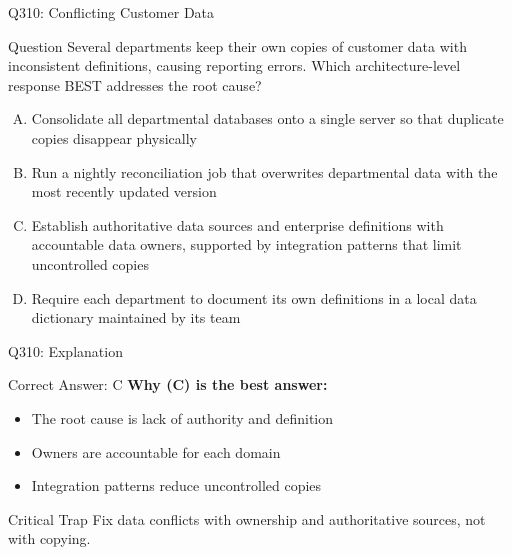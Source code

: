 \documentclass{beamer}
\begin{document}
	\begin{frame}{Q310: Conflicting Customer Data}
		\begin{block}{Question}
			\small Several departments keep their own copies of customer data with inconsistent definitions, causing reporting errors. Which architecture-level response BEST addresses the root cause?
		\end{block}
		\begin{enumerate}[(A)]
			\footnotesize
			\item Consolidate all departmental databases onto a single server so that duplicate copies disappear physically
			\item Run a nightly reconciliation job that overwrites departmental data with the most recently updated version
			\item Establish authoritative data sources and enterprise definitions with accountable data owners, supported by integration patterns that limit uncontrolled copies
			\item Require each department to document its own definitions in a local data dictionary maintained by its team
		\end{enumerate}
	\end{frame}
	
	\begin{frame}{Q310: Explanation}
		\begin{block}{Correct Answer: C}
			\textbf{Why (C) is the best answer:}
			\begin{itemize}
				\item The root cause is lack of authority and definition
				\item Owners are accountable for each domain
				\item Integration patterns reduce uncontrolled copies
			\end{itemize}
		\end{block}
		\begin{alertblock}{Critical Trap}
			Fix data conflicts with ownership and authoritative sources, not with copying.
		\end{alertblock}
	\end{frame}
	
\end{document}
